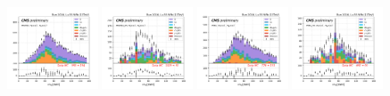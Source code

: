 \begin{figure}
    \includegraphics[width=0.24\textwidth]{appendices/qcdSF/figures/mutau_==1_==1_dilepton_mass.png}
    \includegraphics[width=0.24\textwidth]{appendices/qcdSF/figures/mutau_ss_==1_==1_dilepton_mass.png}
    \includegraphics[width=0.24\textwidth]{appendices/qcdSF/figures/etau_==1_==1_dilepton_mass.png}
    \includegraphics[width=0.24\textwidth]{appendices/qcdSF/figures/etau_ss_==1_==1_dilepton_mass.png}
    

\end{figure}
